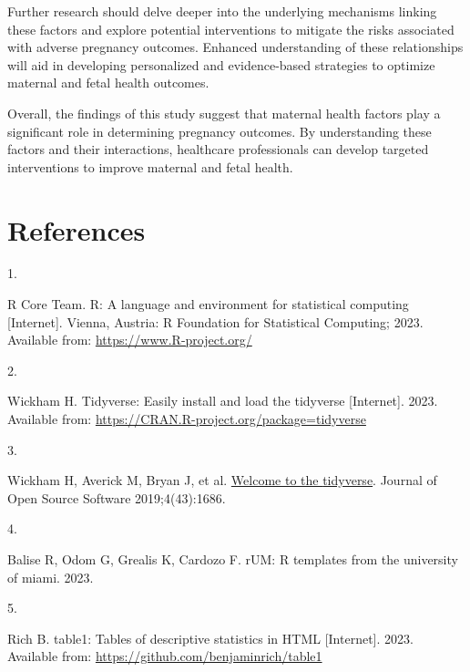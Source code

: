 \documentclass[
  letterpaper,
  DIV=11,
  numbers=noendperiod]{scrartcl}
\newlength{\cslhangindent}
\newlength{\csllabelwidth}
\newlength{\cslentryspacingunit} %
\newenvironment{CSLReferences}[2] %
 {%
  \setlength{\parindent}{0pt}
  \ifodd #1
  \let\oldpar\par
  \def\par{\hangindent=\cslhangindent\oldpar}
  \fi
  \setlength{\parskip}{#2\cslentryspacingunit}
 }%
 {}
\newcommand{\CSLLeftMargin}[1]{\parbox[t]{\csllabelwidth}{#1}}
\newcommand{\CSLRightInline}[1]{\parbox[t]{\linewidth - \csllabelwidth}{#1}\break}
\begin{document}
Further research should delve deeper into the underlying mechanisms
linking these factors and explore potential interventions to mitigate
the risks associated with adverse pregnancy outcomes. Enhanced
understanding of these relationships will aid in developing personalized
and evidence-based strategies to optimize maternal and fetal health
outcomes.

Overall, the findings of this study suggest that maternal health factors
play a significant role in determining pregnancy outcomes. By
understanding these factors and their interactions, healthcare
professionals can develop targeted interventions to improve maternal and
fetal health.

\hypertarget{references}{%
\section*{References}\label{references}}

\hypertarget{refs}{}
\begin{CSLReferences}{0}{0}
\leavevmode{}%
\CSLLeftMargin{1. }%
\CSLRightInline{R Core Team. R: A language and environment for
statistical computing {[}Internet{]}. Vienna, Austria: R Foundation for
Statistical Computing; 2023. Available from:
\url{https://www.R-project.org/}}

\leavevmode{}%
\CSLLeftMargin{2. }%
\CSLRightInline{Wickham H. Tidyverse: Easily install and load the
tidyverse {[}Internet{]}. 2023. Available from:
\url{https://CRAN.R-project.org/package=tidyverse}}

\leavevmode{}%
\CSLLeftMargin{3. }%
\CSLRightInline{Wickham H, Averick M, Bryan J, et al.
\href{https://doi.org/10.21105/joss.01686}{Welcome to the {tidyverse}}.
Journal of Open Source Software 2019;4(43):1686. }

\leavevmode{}%
\CSLLeftMargin{4. }%
\CSLRightInline{Balise R, Odom G, Grealis K, Cardozo F. rUM: R templates
from the university of miami. 2023. }

\leavevmode{}%
\CSLLeftMargin{5. }%
\CSLRightInline{Rich B. table1: Tables of descriptive statistics in HTML
{[}Internet{]}. 2023. Available from:
\url{https://github.com/benjaminrich/table1}}

\end{CSLReferences}
\end{document}
